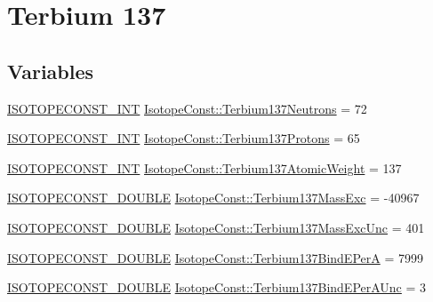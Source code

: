 \hypertarget{group___isotope_const-_terbium-_tb137}{}\section{Terbium 137}
\label{group___isotope_const-_terbium-_tb137}
\subsection*{Variables}
\begin{DoxyCompactItemize}
\item 
\mbox{\hyperlink{group___isotope_const-_macros_ga5f18360b3e99483a35c32d789e62621c}{I\+S\+O\+T\+O\+P\+E\+C\+O\+N\+S\+T\+\_\+\+I\+NT}} \mbox{\hyperlink{group___isotope_const-_terbium-_tb137_gac10b900cb04c8fdcdd2d67286c116da2}{Isotope\+Const\+::\+Terbium137\+Neutrons}} = 72
\item 
\mbox{\hyperlink{group___isotope_const-_macros_ga5f18360b3e99483a35c32d789e62621c}{I\+S\+O\+T\+O\+P\+E\+C\+O\+N\+S\+T\+\_\+\+I\+NT}} \mbox{\hyperlink{group___isotope_const-_terbium-_tb137_ga20d5455cda80f8869577a7ce15947973}{Isotope\+Const\+::\+Terbium137\+Protons}} = 65
\item 
\mbox{\hyperlink{group___isotope_const-_macros_ga5f18360b3e99483a35c32d789e62621c}{I\+S\+O\+T\+O\+P\+E\+C\+O\+N\+S\+T\+\_\+\+I\+NT}} \mbox{\hyperlink{group___isotope_const-_terbium-_tb137_ga8d35afdc5eeba776051843f143f01959}{Isotope\+Const\+::\+Terbium137\+Atomic\+Weight}} = 137
\item 
\mbox{\hyperlink{group___isotope_const-_macros_ga8f45a7272ce02c0b4c65c44636ed719a}{I\+S\+O\+T\+O\+P\+E\+C\+O\+N\+S\+T\+\_\+\+D\+O\+U\+B\+LE}} \mbox{\hyperlink{group___isotope_const-_terbium-_tb137_ga8aff36514af28164c89cf04b449f6976}{Isotope\+Const\+::\+Terbium137\+Mass\+Exc}} = -\/40967
\item 
\mbox{\hyperlink{group___isotope_const-_macros_ga8f45a7272ce02c0b4c65c44636ed719a}{I\+S\+O\+T\+O\+P\+E\+C\+O\+N\+S\+T\+\_\+\+D\+O\+U\+B\+LE}} \mbox{\hyperlink{group___isotope_const-_terbium-_tb137_ga3815bdafaeb5c2f8dfa2b04c9281add0}{Isotope\+Const\+::\+Terbium137\+Mass\+Exc\+Unc}} = 401
\item 
\mbox{\hyperlink{group___isotope_const-_macros_ga8f45a7272ce02c0b4c65c44636ed719a}{I\+S\+O\+T\+O\+P\+E\+C\+O\+N\+S\+T\+\_\+\+D\+O\+U\+B\+LE}} \mbox{\hyperlink{group___isotope_const-_terbium-_tb137_ga1043b344478adaa32cafc9eb9e90a803}{Isotope\+Const\+::\+Terbium137\+Bind\+E\+PerA}} = 7999
\item 
\mbox{\hyperlink{group___isotope_const-_macros_ga8f45a7272ce02c0b4c65c44636ed719a}{I\+S\+O\+T\+O\+P\+E\+C\+O\+N\+S\+T\+\_\+\+D\+O\+U\+B\+LE}} \mbox{\hyperlink{group___isotope_const-_terbium-_tb137_ga823a8c3c7c6926764ea13bfdad227a25}{Isotope\+Const\+::\+Terbium137\+Bind\+E\+Per\+A\+Unc}} = 3

\end{DoxyCompactItemize}

